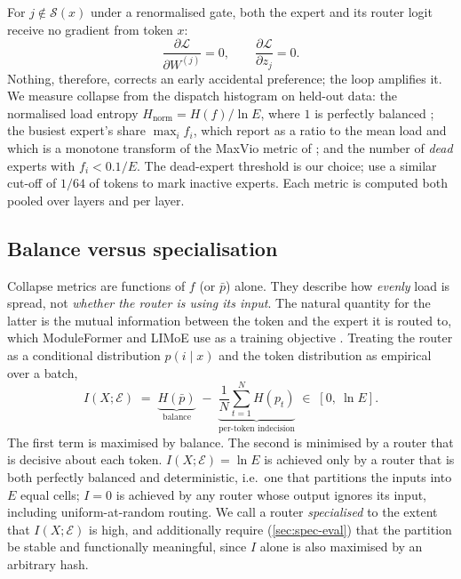 \documentclass[10pt]{article}
\theoremstyle{definition}
\theoremstyle{remark}
\newcommand{\Hn}{H_{\mathrm{norm}}}
\begin{document}
For $j\notin\mathcal{S}(x)$ under a renormalised gate, both the expert and its router logit receive no gradient from token $x$:
\begin{equation}
  \frac{\partial\mathcal{L}}{\partial W^{(j)}} = 0, \qquad \frac{\partial\mathcal{L}}{\partial z_j} = 0 .
  \label{eq:zero-grad}
\end{equation}
Nothing, therefore, corrects an early accidental preference; the loop amplifies it. We measure collapse from the dispatch histogram on held-out data: the normalised load entropy $\Hn = H(f)/\ln E$, where $1$ is perfectly balanced \citep{zhao2026probmoe,mohamud2026selfrouting}; the busiest expert's share $\max_i f_i$, which \citet{shazeer2017outrageously} report as a ratio to the mean load and which is a monotone transform of the MaxVio metric of \citet{wang2024auxfree}; and the number of \emph{dead} experts with $f_i < 0.1/E$. The dead-expert threshold is our choice; \citet{wang2025remoe} use a similar cut-off of $1/64$ of tokens to mark inactive experts. Each metric is computed both pooled over layers and per layer.

\subsection{Balance versus specialisation}
\label{sec:balance-spec}

Collapse metrics are functions of $f$ (or $\bar p$) alone. They describe how \emph{evenly} load is spread, not \emph{whether the router is using its input}. The natural quantity for the latter is the mutual information between the token and the expert it is routed to, which ModuleFormer and LIMoE use as a training objective \citep{shen2023moduleformer,mustafa2022limoe}. Treating the router as a conditional distribution $p(i\mid x)$ and the token distribution as empirical over a batch,
\begin{equation}
  I(X;\mathcal{E}) \;=\; \underbrace{H(\bar p)}_{\text{balance}} \;-\; \underbrace{\frac{1}{N}\sum_{t=1}^N H(p_t)}_{\text{per-token indecision}} \;\in\; [0,\ \ln E].
  \label{eq:mi}
\end{equation}
The first term is maximised by balance. The second is minimised by a router that is decisive about each token. $I(X;\mathcal{E})=\ln E$ is achieved only by a router that is both perfectly balanced and deterministic, i.e.\ one that partitions the inputs into $E$ equal cells; $I=0$ is achieved by any router whose output ignores its input, including uniform-at-random routing. We call a router \emph{specialised} to the extent that $I(X;\mathcal{E})$ is high, and additionally require (\cref{sec:spec-eval}) that the partition be stable and functionally meaningful, since $I$ alone is also maximised by an arbitrary hash.
\end{document}
